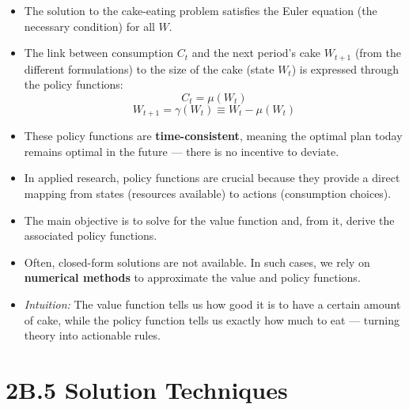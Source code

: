 \documentclass[12pt]{article}
\begin{document}
\begin{itemize}
    \item The solution to the cake-eating problem satisfies the Euler equation (the necessary condition) for all \( W \).

    \item The link between consumption \( C_t \) and the next period’s cake \( W_{t+1} \) (from the different formulations) to the size of the cake (state \( W_t \)) is expressed through the policy functions:
    \[
    C_t = \mu(W_t)
    \]
    \[
    W_{t+1} = \gamma(W_t) \equiv W_t - \mu(W_t)
    \]

    \item These policy functions are \textbf{time-consistent}, meaning the optimal plan today remains optimal in the future — there is no incentive to deviate.

    \item In applied research, policy functions are crucial because they provide a direct mapping from states (resources available) to actions (consumption choices).

    \item The main objective is to solve for the value function and, from it, derive the associated policy functions.

    \item Often, closed-form solutions are not available. In such cases, we rely on \textbf{numerical methods} to approximate the value and policy functions.

    \item \textit{Intuition:} The value function tells us how good it is to have a certain amount of cake, while the policy function tells us exactly how much to eat — turning theory into actionable rules.
\end{itemize}

\section*{\noindent\textbf{2B.5 Solution Techniques}}
\end{document}
